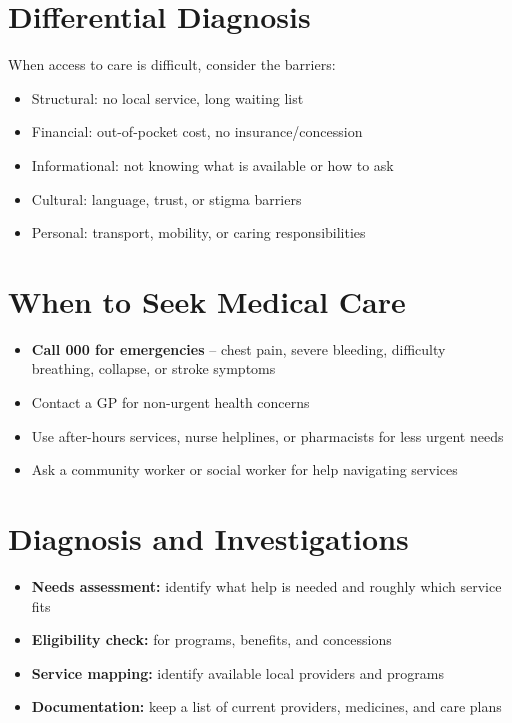 \section*{Differential Diagnosis}
When access to care is difficult, consider the barriers:
\begin{itemize}
    \item Structural: no local service, long waiting list
    \item Financial: out-of-pocket cost, no insurance/concession
    \item Informational: not knowing what is available or how to ask
    \item Cultural: language, trust, or stigma barriers
    \item Personal: transport, mobility, or caring responsibilities
\end{itemize}

\section*{When to Seek Medical Care}
\begin{itemize}
    \item \textbf{Call 000 for emergencies} -- chest pain, severe bleeding, difficulty breathing, collapse, or stroke symptoms
    \item Contact a GP for non-urgent health concerns
    \item Use after-hours services, nurse helplines, or pharmacists for less urgent needs
    \item Ask a community worker or social worker for help navigating services
\end{itemize}

\section*{Diagnosis and Investigations}
\begin{itemize}
    \item \textbf{Needs assessment:} identify what help is needed and roughly which service fits
    \item \textbf{Eligibility check:} for programs, benefits, and concessions
    \item \textbf{Service mapping:} identify available local providers and programs
    \item \textbf{Documentation:} keep a list of current providers, medicines, and care plans
\end{itemize}


